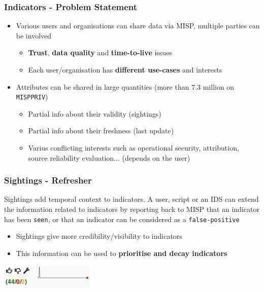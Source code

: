 
\begin{frame}[t,plain]
\titlepage
\end{frame}

\begin{frame}
\frametitle{Indicators - Problem Statement}
    \begin{itemize}
            \item Various users and organisations can share data via MISP, multiple parties can be involved
            \begin{itemize}
                \item \textbf{Trust}, \textbf{data quality} and \textbf{time-to-live} issues
                \item Each user/organisation has \textbf{different use-cases} and interests
            \end{itemize}
        \vspace{0.5cm}
        \item Attributes can be shared in large quantities (more than 7.3 million on \texttt{MISPPRIV})
        \begin{itemize}
            \item Partial info about their validity (sightings)
            \item Partial info about their freshness (last update)
            \item Varius conflicting interests such as operational security, attribution, source reliability evaluation... (depends on the user)
        \end{itemize}
    \end{itemize}
\end{frame}

\begin{frame}
\frametitle{Sightings - Refresher}
    Sightings add temporal context to indicators.
    A user, script or an IDS can extend the information related to indicators by reporting back to MISP that
    an indicator has been \texttt{seen}, or that an indicator can be considered as a \texttt{false-positive}
    \vspace{0.5cm}
    \begin{itemize}
        \item Sightings give more credibility/visibility to indicators
        \item This information can be used to {\bf prioritise and decay indicators}
    \end{itemize}
    \begin{center}
        \includegraphics[scale=1.00]{pics/sightings.png}
    \end{center}
\end{frame}

